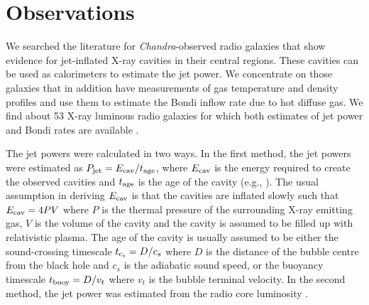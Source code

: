 \documentclass[useAMS,usenatbib]{mn2e}
\begin{document}
\section{Observations}	\label{sec:obs}

We searched the literature for \emph{Chandra}-observed radio galaxies that show evidence for jet-inflated X-ray cavities in their central regions. These cavities can be used as calorimeters to estimate the jet power. We concentrate on those galaxies that in addition have measurements of gas temperature and density profiles and use them to estimate the Bondi inflow rate due to hot diffuse gas. We find about 53 X-ray luminous radio galaxies for which both estimates of jet power and Bondi rates are available \citep{Allen06, Rafferty06, Balmaverde08, Russell13}.

The jet powers were calculated in two ways. In the first method, the jet powers were estimated as $P_{\rm jet} = E_{\rm cav}/t_{\rm age}$, where $E_{\rm cav}$ is the energy required to create the observed cavities and $t_{\rm age}$ is the age of the cavity (e.g., \citealt{Churazov02,Birzan04,Dunn04,Dunn05,Allen06,Russell13}). The usual assumption in deriving $E_{\rm cav}$ is that the cavities are inflated slowly such that $E_{\rm cav}=4PV$ where $P$ is the thermal pressure of the surrounding X-ray emitting gas, $V$ is the volume of the cavity and the cavity is assumed to be filled up with relativistic plasma. The age of the cavity is usually assumed to be either the sound-crossing timescale $t_{\rm c_s}=D/c_s$ where $D$ is the distance of the bubble centre from the black hole and $c_s$ is the adiabatic sound speed, or the buoyancy timescale $t_{\rm buoy}=D/v_t$ where $v_t$ is the bubble terminal velocity. In the second method, the jet power was estimated from the radio core luminosity \citep{Heinz07,Balmaverde08}.
\end{document}
